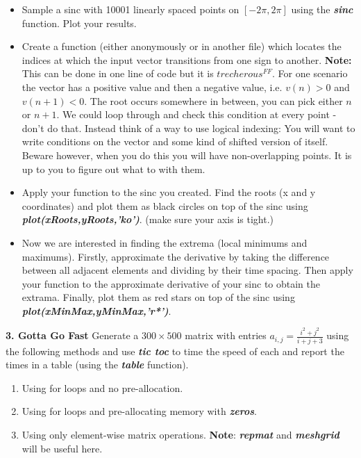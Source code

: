 \documentclass[11pt]{article}
\newenvironment{qparts}{\begin{enumerate}[{(}a{)}]}{\end{enumerate}}
\begin{document}
\begin{itemize}
    \item Sample a sinc with 10001 linearly spaced points on $[-2\pi, 2\pi]$ using 
    the \textbf{\textit{sinc}} function. Plot your results.

    \item Create a function (either anonymously or in another file) which locates
    the indices at which the input vector transitions from one sign to another.
    \textbf{Note:} This can be done in one line of code but it is $trecherous^{FF}$.
    For one scenario the vector has a positive value and then a negative value,
    i.e. $v(n) > 0$ and $v(n+1) < 0$. 
    The root occurs somewhere in between, you can pick either $n$ or $n+1$.
    We could loop through and check this condition at every point - don't do that.
    Instead think of a way to use logical indexing:
    You will want to write conditions on the vector and some kind of shifted version of itself.
    Beware however, when you do this you will have non-overlapping points.
    It is up to you to figure out what to with them.

    \item Apply your function to the sinc you created.
    Find the roots (x and y coordinates) and plot them as black circles
    on top of the sinc using \textbf{\textit{plot(xRoots,yRoots,'ko')}}.
    (make sure your axis is tight.)  

    \item Now we are interested in finding the extrema
    (local minimums and maximums).
    Firstly, approximate the derivative by taking the difference between all adjacent elements
    and dividing by their time spacing.
    Then apply your function to the approximate derivative of your sinc to obtain the extrama.
    Finally, plot them as red stars on top of the sinc using \textbf{\textit{plot(xMinMax,yMinMax,'r*')}}.
\end{itemize}

\noindent
\newline
\textbf{3. Gotta Go Fast}
Generate a $300 \times 500$ matrix with entries $a_{i,j} = \frac{i^2+j^2}{i+j+3} $
using the following methods and use \textbf{\textit{tic toc}} to time the speed of each and
report the times in a table (using the \textbf{\textit{table}} function).

\begin{qparts}
    \item Using for loops and no pre-allocation.

    \item Using for loops and pre-allocating memory with \textbf{\textit{zeros}}.

    \item Using only element-wise matrix operations.
    \textbf{Note}: \textbf{\textit{repmat}} and \textbf{\textit{meshgrid}} will be useful here. 
\end{qparts}
\end{document}
